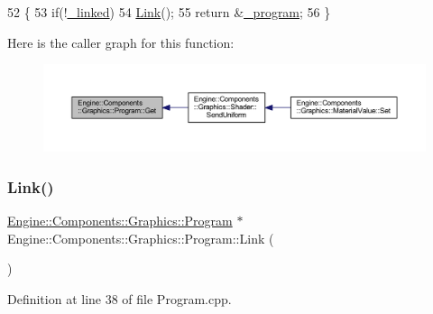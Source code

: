 \begin{DoxyCode}
52 \{
53     \textcolor{keywordflow}{if}(!\mbox{\hyperlink{classEngine_1_1Components_1_1Graphics_1_1Program_abd46071ffae3fccf2730393cecad9646}{\_linked}})
54         \mbox{\hyperlink{classEngine_1_1Components_1_1Graphics_1_1Program_aca3b3c45bf67386dc5fb3c25d687593a}{Link}}();
55     \textcolor{keywordflow}{return} &\mbox{\hyperlink{classEngine_1_1Components_1_1Graphics_1_1Program_a23fb9432b8cd14e9cfa27e23f483712d}{\_program}};
56 \}
\end{DoxyCode}
Here is the caller graph for this function\+:
\nopagebreak
\begin{figure}[H]
\begin{center}
\leavevmode
\includegraphics[width=350pt]{classEngine_1_1Components_1_1Graphics_1_1Program_a2f8a229f633939c001fcfc46f7b7fd0b_icgraph}
\end{center}
\end{figure}
\mbox{\label{classEngine_1_1Components_1_1Graphics_1_1Program_aca3b3c45bf67386dc5fb3c25d687593a}} 
\subsubsection{\texorpdfstring{Link()}{Link()}}
{\footnotesize\ttfamily \mbox{\hyperlink{classEngine_1_1Components_1_1Graphics_1_1Program}{Engine\+::\+Components\+::\+Graphics\+::\+Program}} $\ast$ Engine\+::\+Components\+::\+Graphics\+::\+Program\+::\+Link (\begin{DoxyParamCaption}{ }\end{DoxyParamCaption})}



Definition at line 38 of file Program.\+cpp.


